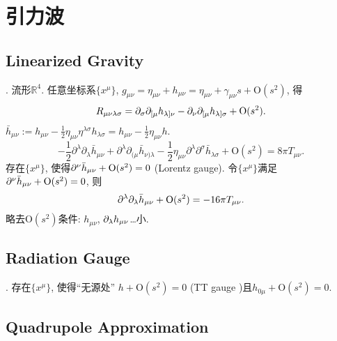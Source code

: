 \chapter{引力波}

\section{Linearized Gravity}

\cite{Wald1984}. 流形$\mathbb{R}^{4}$. 任意坐标系$\{x^{\mu}\}$, $g_{\mu\nu}=\eta_{\mu\nu}+h_{\mu\nu}=\eta_{\mu\nu}+\gamma_{\mu\nu}s+\text{O}(s^2)$, 得
\begin{equation}
    R_{\mu\nu\lambda\sigma}=\partial_\sigma\partial_{[\mu}h_{\lambda]\nu}-\partial_\nu\partial_{[\mu}h_{\lambda]\sigma}+\text{O}(s^2).
\end{equation}
$\bar{h}_{\mu\nu}:=h_{\mu\nu}-\frac{1}{2}\eta_{\mu\nu}\eta^{\lambda\sigma}h_{\lambda\sigma}=h_{\mu\nu}-\frac{1}{2}\eta_{\mu\nu}h$.
\begin{equation}
    -\frac{1}{2} \partial^{\lambda} \partial_{\lambda} \bar{h}_{\mu \nu}+\partial^{\lambda} \partial_{(\mu} \bar{h}_{\nu) \lambda}-\frac{1}{2} \eta_{\mu \nu} \partial^{\lambda} \partial^{\sigma} \bar{h}_{\lambda \sigma}+\text{O}(s^2)=8 \pi T_{\mu \nu}.
\end{equation}
存在$\{x^{\mu}\}$, 使得$\partial^{\nu}\bar{h}_{\mu\nu}+\text{O}(s^2)=0$ (Lorentz gauge). 
令$\{x^{\mu}\}$满足$\partial^{\nu}\bar{h}_{\mu\nu}+\text{O}(s^2)=0$, 则
\begin{equation}
    \partial^{\lambda}\partial_{\lambda}\bar{h}_{\mu\nu}+\text{O}(s^2)=-16\pi T_{\mu \nu}.\label{lin_gravity}
\end{equation}
略去$\text{O}(s^2)$条件: $h_{\mu\nu}$, $\partial_\lambda h_{\mu\nu}$\dots{}小.

\section{Radiation Gauge}

\cite{Wald1984}. 存在$\{x^{\mu}\}$, 使得``无源处'' $h+\text{O}(s^2)=0$ (TT gauge \cite{Wang2020})且$h_{0\mu}+\text{O}(s^2)=0$. 

\section{Quadrupole Approximation}

